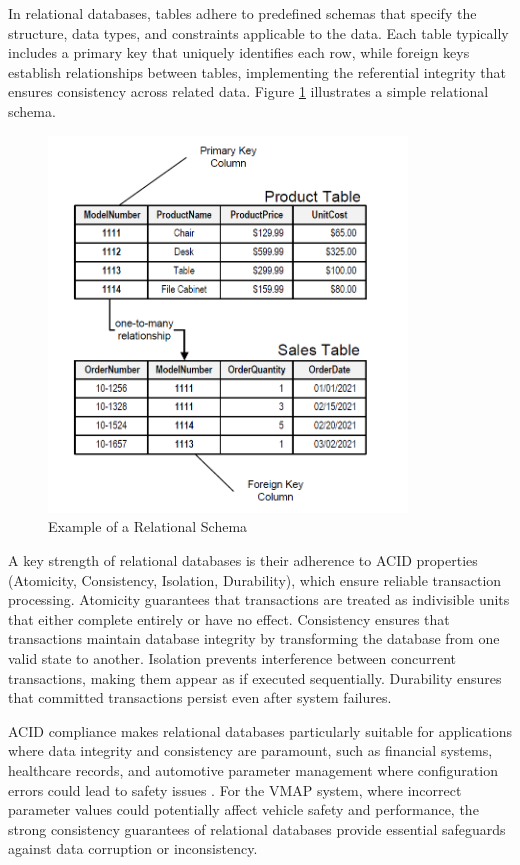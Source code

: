 In relational databases, tables adhere to predefined schemas that specify the structure, data types, and constraints applicable to the data. Each table typically includes a primary key that uniquely identifies each row, while foreign keys establish relationships between tables, implementing the referential integrity that ensures consistency across related data. Figure \ref{fig:relational-schema} illustrates a simple relational schema.

\begin{figure}[ht]
    \centering
    \includegraphics[width=0.85\textwidth]{figures/relational_schema.png}
    \caption{Example of a Relational Schema \cite{noah2024relational}}
    \label{fig:relational-schema}
\end{figure}

A key strength of relational databases is their adherence to ACID properties (Atomicity, Consistency, Isolation, Durability), which ensure reliable transaction processing. Atomicity guarantees that transactions are treated as indivisible units that either complete entirely or have no effect. Consistency ensures that transactions maintain database integrity by transforming the database from one valid state to another. Isolation prevents interference between concurrent transactions, making them appear as if executed sequentially. Durability ensures that committed transactions persist even after system failures.

ACID compliance makes relational databases particularly suitable for applications where data integrity and consistency are paramount, such as financial systems, healthcare records, and automotive parameter management where configuration errors could lead to safety issues \cite{staron2021automotive}. For the VMAP system, where incorrect parameter values could potentially affect vehicle safety and performance, the strong consistency guarantees of relational databases provide essential safeguards against data corruption or inconsistency.


